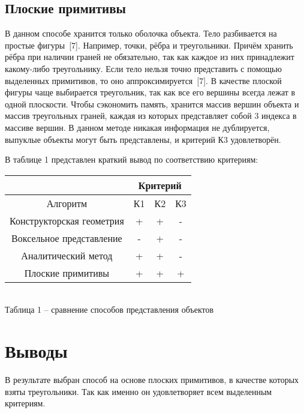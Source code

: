 {    \subsection{Плоские примитивы} {
        В данном способе хранится только оболочка объекта.
        Тело разбивается на простые фигуры~[7].
        Например, точки, рёбра и треугольники.
        Причём хранить рёбра при наличии граней не обязательно, так как
        каждое из них принадлежит какому-либо треугольнику.
        Если тело нельзя точно представить с помощью выделенных примитивов,
        то оно аппроксимируется~[7].
        В качестве плоской фигуры чаще выбирается треугольник, так как все его вершины всегда лежат в одной плоскости.
        Чтобы сэкономить память, хранится массив вершин объекта и массив треугольных граней, каждая из которых представляет собой 3 индекса в массиве вершин.
        В данном методе никакая информация не дублируется, выпуклые объекты могут
        быть представлены, и критерий К3 удовлетворён.
    }

    В таблице 1 представлен краткий вывод по соответствию критериям: \\
    \begin{center}
        \begin{tabular} { |c|c|c|c| }
            \hline
            \hspace{0pt} & \multicolumn{3}{|c|}{Критерий} \\
            \hline
            Алгоритм & К1 & К2 & К3 \\
            \hline
            Конструкторская геометрия & + & + & - \\
            \hline
            Воксельное представление & - & + & - \\
            \hline
            Аналитический метод & + & + & - \\
            \hline
            Плоские примитивы & + & + & + \\
            \hline
        \end{tabular} \\
        \vspace{2mm}
        \small { Таблица 1 -- сравнение способов представления объектов }
    \end{center}

    \section*{Выводы} {
        В результате выбран способ на основе плоских примитивов,
        в качестве которых взяты треугольники.
        Так как именно он удовлетворяет всем выделенным критериям.
    }
}